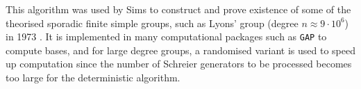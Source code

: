{%


This algorithm was used by Sims to construct and prove existence of some of the theorised sporadic finite simple groups, such as Lyons' group (degree $n \approx 9 \cdot 10^6$) in 1973 \cite{sims1973}. It is implemented in many computational packages such as \texttt{GAP} to compute bases, and for large degree groups, a randomised variant is used to speed up computation since the number of Schreier generators to be processed becomes too large for the deterministic algorithm.}
